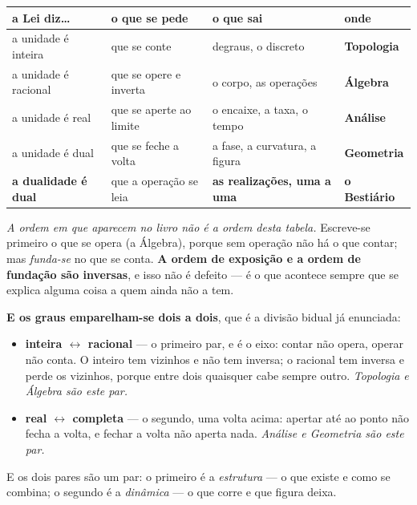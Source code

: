 \documentclass[livro.tex]{subfiles}
\begin{document}
\begin{center}\small
\begin{tabular}{@{}llll@{}}
\toprule
\textbf{a Lei diz\dots} & \textbf{o que se pede} & \textbf{o que sai} & \textbf{onde} \\
\midrule
a unidade é inteira    & que se conte           & degraus, o discreto & \textbf{Topologia} \\
a unidade é racional   & que se opere e inverta & o corpo, as operações & \textbf{Álgebra} \\
a unidade é real       & que se aperte ao limite & o encaixe, a taxa, o tempo & \textbf{Análise} \\
a unidade é dual       & que se feche a volta   & a fase, a curvatura, a figura & \textbf{Geometria} \\
\textbf{a dualidade é dual} & que a operação se leia & \textbf{as realizações, uma a uma} & \textbf{o Bestiário} \\
\bottomrule
\end{tabular}
\end{center}

\noindent \emph{A ordem em que aparecem no livro não é a ordem desta tabela.} Escreve-se primeiro o que se opera (a Álgebra), porque sem operação não há o que
contar; mas \emph{funda-se} no que se conta. \textbf{A ordem de exposição e a ordem de fundação são
inversas}, e isso não é defeito --- é o que acontece sempre que se explica alguma coisa a quem
ainda não a tem.

\medskip
\noindent \textbf{E os graus emparelham-se dois a dois}, que é a divisão bidual já enunciada:

\begin{itemize}\itemsep2pt
\item \textbf{inteira $\leftrightarrow$ racional} --- o primeiro par, e é o eixo: contar não opera,
operar não conta. O inteiro tem vizinhos e não tem inversa; o racional tem inversa e perde os
vizinhos, porque entre dois quaisquer cabe sempre outro. \emph{Topologia e Álgebra são este par.}
\item \textbf{real $\leftrightarrow$ completa} --- o segundo, uma volta acima: apertar até ao ponto
não fecha a volta, e fechar a volta não aperta nada. \emph{Análise e Geometria são este par.}
\end{itemize}

\noindent E os dois pares são um par: o primeiro é a \emph{estrutura} --- o que existe e como se
combina; o segundo é a \emph{dinâmica} --- o que corre e que figura deixa.
\end{document}
